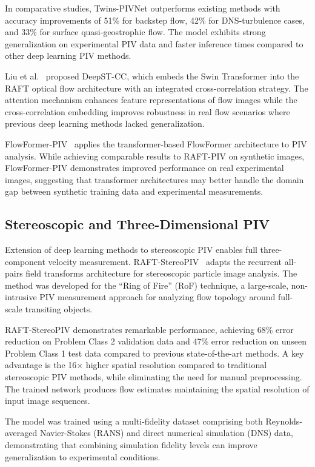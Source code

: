 In comparative studies, Twins-PIVNet outperforms existing methods with accuracy improvements of 51\% for backstep flow, 42\% for DNS-turbulence cases, and 33\% for surface quasi-geostrophic flow. The model exhibits strong generalization on experimental PIV data and faster inference times compared to other deep learning PIV methods.

Liu et al.~\cite{liu2024deepst_cc} proposed DeepST-CC, which embeds the Swin Transformer into the RAFT optical flow architecture with an integrated cross-correlation strategy. The attention mechanism enhances feature representations of flow images while the cross-correlation embedding improves robustness in real flow scenarios where previous deep learning methods lacked generalization.

FlowFormer-PIV~\cite{yu2025flowformer_piv} applies the transformer-based FlowFormer architecture to PIV analysis. While achieving comparable results to RAFT-PIV on synthetic images, FlowFormer-PIV demonstrates improved performance on real experimental images, suggesting that transformer architectures may better handle the domain gap between synthetic training data and experimental measurements.

\subsection{Stereoscopic and Three-Dimensional PIV}

Extension of deep learning methods to stereoscopic PIV enables full three-component velocity measurement. RAFT-StereoPIV~\cite{lagemann2024raft_stereopiv} adapts the recurrent all-pairs field transforms architecture for stereoscopic particle image analysis. The method was developed for the ``Ring of Fire'' (RoF) technique, a large-scale, non-intrusive PIV measurement approach for analyzing flow topology around full-scale transiting objects.

RAFT-StereoPIV demonstrates remarkable performance, achieving 68\% error reduction on Problem Class 2 validation data and 47\% error reduction on unseen Problem Class 1 test data compared to previous state-of-the-art methods. A key advantage is the 16$\times$ higher spatial resolution compared to traditional stereoscopic PIV methods, while eliminating the need for manual preprocessing. The trained network produces flow estimates maintaining the spatial resolution of input image sequences.

The model was trained using a multi-fidelity dataset comprising both Reynolds-averaged Navier-Stokes (RANS) and direct numerical simulation (DNS) data, demonstrating that combining simulation fidelity levels can improve generalization to experimental conditions.

